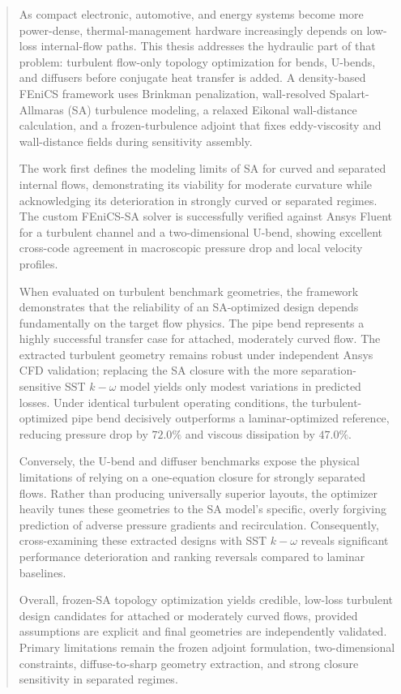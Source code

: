 \documentclass[master=ewtk,masteroption=,openany]{kulemt}
\begin{document}
\begin{abstract}
	
	As compact electronic, automotive, and energy systems become more power-dense, thermal-management hardware increasingly depends on low-loss internal-flow paths. This thesis addresses the hydraulic part of that problem: turbulent flow-only topology optimization for bends, U-bends, and diffusers before conjugate heat transfer is added. A density-based FEniCS framework uses Brinkman penalization, wall-resolved Spalart-Allmaras (SA) turbulence modeling, a relaxed Eikonal wall-distance calculation, and a frozen-turbulence adjoint that fixes eddy-viscosity and wall-distance fields during sensitivity assembly.
	
	The work first defines the modeling limits of SA for curved and separated internal flows, demonstrating its viability for moderate curvature while acknowledging its deterioration in strongly curved or separated regimes. The custom FEniCS-SA solver is successfully verified against Ansys Fluent for a turbulent channel and a two-dimensional U-bend, showing excellent cross-code agreement in macroscopic pressure drop and local velocity profiles.
	
	When evaluated on turbulent benchmark geometries, the framework demonstrates that the reliability of an SA-optimized design depends fundamentally on the target flow physics. The pipe bend represents a highly successful transfer case for attached, moderately curved flow. The extracted turbulent geometry remains robust under independent Ansys CFD validation; replacing the SA closure with the more separation-sensitive SST $k-\omega$ model yields only modest variations in predicted losses. Under identical turbulent operating conditions, the turbulent-optimized pipe bend decisively outperforms a laminar-optimized reference, reducing pressure drop by $72.0\%$ and viscous dissipation by $47.0\%$.
	
	Conversely, the U-bend and diffuser benchmarks expose the physical limitations of relying on a one-equation closure for strongly separated flows. Rather than producing universally superior layouts, the optimizer heavily tunes these geometries to the SA model's specific, overly forgiving prediction of adverse pressure gradients and recirculation. Consequently, cross-examining these extracted designs with SST $k-\omega$ reveals significant performance deterioration and ranking reversals compared to laminar baselines.
	
	Overall, frozen-SA topology optimization yields credible, low-loss turbulent design candidates for attached or moderately curved flows, provided assumptions are explicit and final geometries are independently validated. Primary limitations remain the frozen adjoint formulation, two-dimensional constraints, diffuse-to-sharp geometry extraction, and strong closure sensitivity in separated regimes.
	
\end{abstract}
\end{document}
